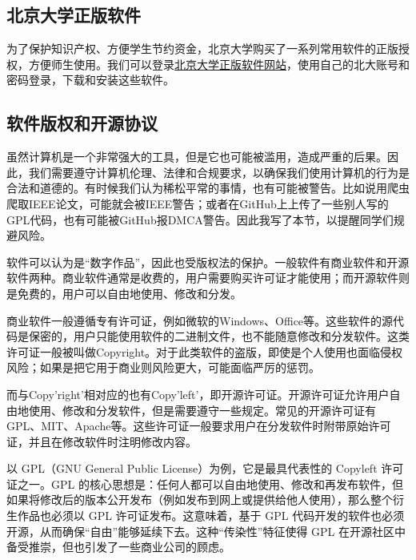\subsection{北京大学正版软件}

为了保护知识产权、方便学生节约资金，北京大学购买了一系列常用软件的正版授权，方便师生使用。我们可以登录\href{https://software.pku.edu.cn/}{北京大学正版软件网站}，使用自己的北大账号和密码登录，下载和安装这些软件。

\subsection{软件版权和开源协议}

虽然计算机是一个非常强大的工具，但是它也可能被滥用，造成严重的后果。因此，我们需要遵守计算机伦理、法律和合规要求，以确保我们使用计算机的行为是合法和道德的。有时候我们认为稀松平常的事情，也有可能被警告。比如说用爬虫爬取IEEE论文，可能就会被IEEE警告；或者在GitHub上上传了一些别人写的GPL代码，也有可能被GitHub报DMCA警告。因此我写了本节，以提醒同学们规避风险。

软件可以认为是“数字作品”，因此也受版权法的保护。一般软件有商业软件和开源软件两种。商业软件通常是收费的，用户需要购买许可证才能使用；而开源软件则是免费的，用户可以自由地使用、修改和分发。

商业软件一般遵循专有许可证，例如微软的Windows、Office等。这些软件的源代码是保密的，用户只能使用软件的二进制文件，也不能随意修改和分发软件。这类许可证一般被叫做Copyright。对于此类软件的盗版，即使是个人使用也面临侵权风险；如果是把它用于商业则风险更大，可能面临严厉的惩罚。

而与Copy'right'相对应的也有Copy'left'，即开源许可证。开源许可证允许用户自由地使用、修改和分发软件，但是需要遵守一些规定。常见的开源许可证有GPL、MIT、Apache等。这些许可证一般要求用户在分发软件时附带原始许可证，并且在修改软件时注明修改内容。

以 GPL（GNU General Public License）为例，它是最具代表性的 Copyleft 许可证之一。GPL 的核心思想是：任何人都可以自由地使用、修改和再发布软件，但如果将修改后的版本公开发布（例如发布到网上或提供给他人使用），那么整个衍生作品也必须以 GPL 许可证发布。这意味着，基于 GPL 代码开发的软件也必须开源，从而确保“自由”能够延续下去。这种“传染性”特征使得 GPL 在开源社区中备受推崇，但也引发了一些商业公司的顾虑。


